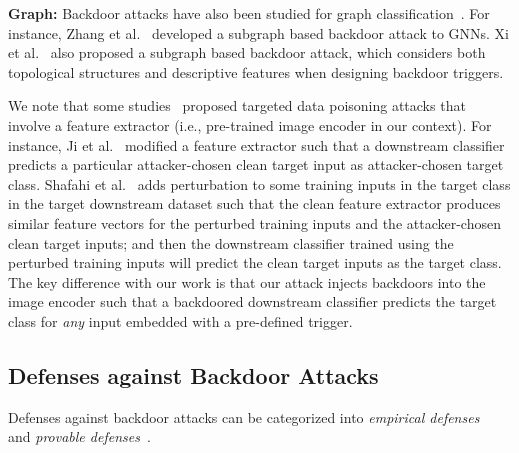 \noindent
{\bf Graph:} Backdoor attacks have also been studied for graph classification~\cite{zhang2020backdoor,xi2020graph}. For instance, Zhang et al.~\cite{zhang2020backdoor} developed a subgraph based backdoor attack to  GNNs. 
Xi et al.~\cite{xi2020graph} also proposed a subgraph based backdoor attack, which considers both topological structures and descriptive features when designing backdoor triggers. 


We note that some studies~\cite{ji2017backdoor,ji2018model,shafahi2018poison}
proposed targeted data poisoning attacks that involve a feature extractor (i.e., pre-trained image encoder in our context). For instance, Ji et al.~\cite{ji2018model} modified a feature extractor such that a downstream classifier predicts a particular attacker-chosen clean target input as attacker-chosen target class. Shafahi et al.~\cite{shafahi2018poison} adds perturbation to some training inputs in the target class in the target downstream dataset such that the clean feature extractor produces similar feature vectors for the perturbed training inputs and the attacker-chosen clean target inputs; and then the downstream classifier trained using the perturbed training inputs will predict the clean target inputs as the target class. The key difference with our work is that our attack injects backdoors into the image encoder such that a backdoored downstream classifier predicts the target class for \emph{any} input embedded with a pre-defined trigger. 







\subsection{Defenses against Backdoor Attacks}
 Defenses against backdoor attacks can be categorized into \emph{empirical defenses}~\cite{tran2018spectral,wang2019neural,guo2019tabor,chen2018detecting,xu2019detecting,gao2019strip,liu2019abs,chen2019deepinspect,tang2019demon,chou2020sentinet,doan2020februus} and \emph{provable defenses}~\cite{chiang2019certified,levine2020randomized,xiang2020patchguard,wang2020certifying,weber2020rab,zhang2020backdoor,metzen2021efficient}. 
 

